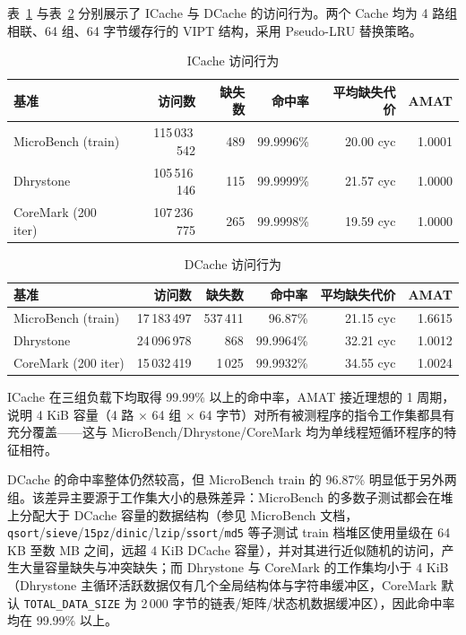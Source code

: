 表~\ref{tbl:perf-icache} 与表~\ref{tbl:perf-dcache} 分别展示了 ICache 与 DCache 的访问行为。两个 Cache 均为 4 路组相联、64 组、64 字节缓存行的 VIPT 结构，采用 Pseudo-LRU 替换策略。

\begin{table}[H]
  \centering
  \caption{ICache 访问行为}
  \label{tbl:perf-icache}
  \begin{tabular}{lrrrrr}
    \toprule
    基准 & 访问数 & 缺失数 & 命中率 & 平均缺失代价 & AMAT \\
    \midrule
    MicroBench (train) & 115\,033\,542 & 489 & 99.9996\% & 20.00 cyc & 1.0001 \\
    Dhrystone & 105\,516\,146 & 115 & 99.9999\% & 21.57 cyc & 1.0000 \\
    CoreMark (200 iter) & 107\,236\,775 & 265 & 99.9998\% & 19.59 cyc & 1.0000 \\
    \bottomrule
  \end{tabular}
\end{table}

\begin{table}[H]
  \centering
  \caption{DCache 访问行为}
  \label{tbl:perf-dcache}
  \begin{tabular}{lrrrrr}
    \toprule
    基准 & 访问数 & 缺失数 & 命中率 & 平均缺失代价 & AMAT \\
    \midrule
    MicroBench (train) & 17\,183\,497 & 537\,411 & 96.87\% & 21.15 cyc & 1.6615 \\
    Dhrystone & 24\,096\,978 & 868 & 99.9964\% & 32.21 cyc & 1.0012 \\
    CoreMark (200 iter) & 15\,032\,419 & 1\,025 & 99.9932\% & 34.55 cyc & 1.0024 \\
    \bottomrule
  \end{tabular}
\end{table}

ICache 在三组负载下均取得 99.99\% 以上的命中率，AMAT 接近理想的 1 周期，说明 4 KiB 容量（4 路 $\times$ 64 组 $\times$ 64 字节）对所有被测程序的指令工作集都具有充分覆盖——这与 MicroBench/Dhrystone/CoreMark 均为单线程短循环程序的特征相符。

DCache 的命中率整体仍然较高，但 MicroBench train 的 96.87\% 明显低于另外两组。该差异主要源于工作集大小的悬殊差异：MicroBench 的多数子测试都会在堆上分配大于 DCache 容量的数据结构（参见 MicroBench 文档，\lstinline|qsort|/\lstinline|sieve|/\lstinline|15pz|/\lstinline|dinic|/\lstinline|lzip|/\lstinline|ssort|/\lstinline|md5| 等子测试 train 档堆区使用量级在 64 KB 至数 MB 之间，远超 4 KiB DCache 容量），并对其进行近似随机的访问，产生大量容量缺失与冲突缺失；而 Dhrystone 与 CoreMark 的工作集均小于 4 KiB（Dhrystone 主循环活跃数据仅有几个全局结构体与字符串缓冲区，CoreMark 默认 \lstinline|TOTAL_DATA_SIZE| 为 2\,000 字节的链表/矩阵/状态机数据缓冲区），因此命中率均在 99.99\% 以上。

